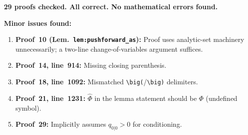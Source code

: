 \documentclass{article}
\begin{document}
\textbf{29 proofs checked.  All correct.  No mathematical errors found.}

\bigskip\noindent
\textbf{Minor issues found:}
\begin{enumerate}
  \item \textbf{Proof~10 (Lem.\ \texttt{lem:pushforward\_as}):}
    Proof uses analytic-set machinery unnecessarily; a two-line
    change-of-variables argument suffices.
  \item \textbf{Proof~14, line~914:} Missing closing parenthesis.
  \item \textbf{Proof~18, line~1092:} Mismatched \verb|\big(|/\verb|\big)|
    delimiters.
  \item \textbf{Proof~21, line~1231:} $\hat\Phi$ in the lemma statement should
    be $\Phi$ (undefined symbol).
  \item \textbf{Proof~29:} Implicitly assumes $q_{0|0}>0$ for conditioning.
\end{enumerate}
\end{document}
